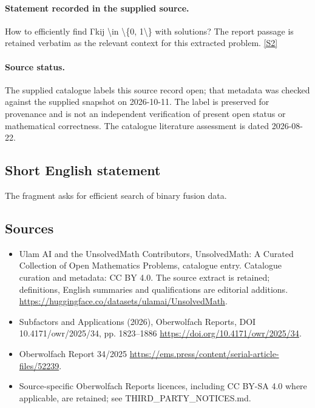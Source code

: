 \documentclass[11pt]{article}
\begin{document}
\paragraph{Statement recorded in the supplied source.}
How to eﬃciently ﬁnd Γkij \textbackslash{}in \textbackslash{}\{0, 1\textbackslash{}\} with solutions? The report passage is retained verbatim as the relevant context for this extracted problem. \href{https://doi.org/10.4171/owr/2025/34}{[S2]}
\paragraph{Source status.}
The supplied catalogue labels this source record open; that metadata was checked against the supplied snapshot on 2026-10-11. The label is preserved for provenance and is not an independent verification of present open status or mathematical correctness. The catalogue literature assessment is dated 2026-08-22.
\subsection{Short English statement}
The fragment asks for efficient search of binary fusion data.
\subsection{Sources}
\begin{itemize}
\item[S1] Ulam AI and the UnsolvedMath Contributors, UnsolvedMath: A Curated Collection of Open Mathematics Problems, catalogue entry. Catalogue curation and metadata: CC BY 4.0. The source extract is retained; definitions, English summaries and qualifications are editorial additions.
\url{https://huggingface.co/datasets/ulamai/UnsolvedMath}.
\item[S2] Subfactors and Applications (2026), Oberwolfach Reports, DOI 10.4171/owr/2025/34, pp. 1823--1886
\url{https://doi.org/10.4171/owr/2025/34}.
\item[S3] Oberwolfach Report 34/2025
\url{https://ems.press/content/serial-article-files/52239}.
\item Source-specific Oberwolfach Reports licences, including CC BY-SA 4.0 where applicable, are retained; see THIRD\_PARTY\_NOTICES.md.
\end{itemize}
\end{document}
